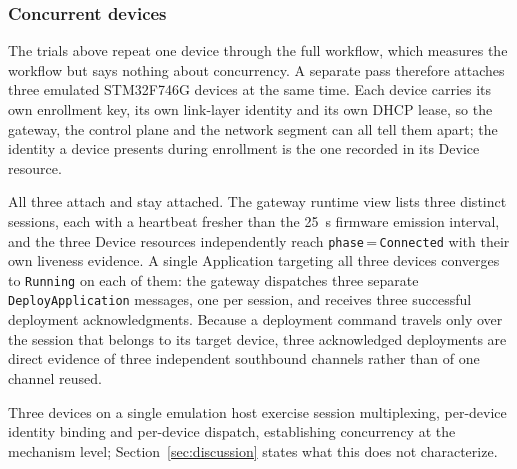 \subsubsection{Concurrent devices}\label{sec:concurrent-devices}
\begingroup
\color{red}
The trials above repeat one device through the full workflow, which measures the
workflow but says nothing about concurrency. A separate pass therefore attaches three
emulated STM32F746G devices at the same time. Each device carries its own enrollment
key, its own link-layer identity and its own DHCP lease, so the gateway, the control
plane and the network segment can all tell them apart; the identity a device presents
during enrollment is the one recorded in its Device resource.

All three attach and stay attached. The gateway runtime view lists three distinct
sessions, each with a heartbeat fresher than the 25~s firmware emission interval,
and the three Device resources independently reach \texttt{phase}\,=\,\texttt{Connected}
with their own liveness evidence. A single Application targeting all three devices
converges to \texttt{Running} on each of them: the gateway dispatches three separate
\texttt{DeployApplication} messages, one per session, and receives three successful
deployment acknowledgments. Because a deployment command travels only over the session
that belongs to its target device, three acknowledged deployments are direct evidence
of three independent southbound channels rather than of one channel reused.

Three devices on a single emulation host exercise session multiplexing, per-device
identity binding and per-device dispatch, establishing concurrency at the mechanism
level; Section~\ref{sec:discussion} states what this does not characterize.
\endgroup

